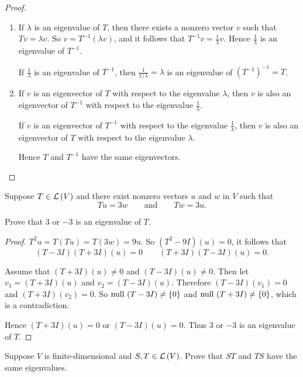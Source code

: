 \begin{proof}
    \begin{enumerate}[label={(\alph*)}]
        \item If $\lambda$ is an eigenvalue of $T$, then there exists a nonzero vector $v$ such that $Tv = \lambda v$. So $v = T^{-1}(\lambda v)$, and it follows that $T^{-1}v = \frac{1}{\lambda}v$. Hence $\frac{1}{\lambda}$ is an eigenvalue of $T^{-1}$.

              If $\frac{1}{\lambda}$ is an eigenvalue of $T^{-1}$, then $\frac{1}{1/\lambda} = \lambda$ is an eigenvalue of ${(T^{-1})}^{-1} = T$.
        \item If $v$ is an eigenvector of $T$ with respect to the eigenvalue $\lambda$, then $v$ is also an eigenvector of $T^{-1}$ with respect to the eigenvalue $\frac{1}{\lambda}$.

              If $v$ is an eigenvector of $T^{-1}$ with respect to the eigenvalue $\frac{1}{\lambda}$, then $v$ is also an eigenvector of $T$ with respect to the eigenvalue $\lambda$.

              Hence $T$ and $T^{-1}$ have the same eigenvectors.\qedhere
    \end{enumerate}
\end{proof}
\newpage

\begin{exercise}
    Suppose $T \in \mathcal{L}\left({V}\right)$ and there exist nonzero vectors $u$ and $w$ in $V$ such that
    \[
        Tu = 3w \qquad\text{and}\qquad Tw = 3u.
    \]

    Prove that $3$ or $-3$ is an eigenvalue of $T$.
\end{exercise}

\begin{proof}
    $T^{2}u = T(Tu) = T(3w) = 9u$. So $(T^{2} - 9I)(u) = 0$, it follows that
    \[
        (T - 3I)(T + 3I)(u) = 0\qquad (T + 3I)(T - 3I)(u) = 0.
    \]

    Assume that $(T + 3I)(u)\ne 0$ and $(T - 3I)(u)\ne 0$. Then let $v_{1} = (T + 3I)(u)$ and $v_{2} = (T - 3I)(u)$. Therefore $(T - 3I)(v_{1}) = 0$ and $(T + 3I)(v_{2}) = 0$. So $\operatorname{null}\,{(T - 3I)}\ne \{0\}$ and $\operatorname{null}\,{(T + 3I)}\ne \{0\}$, which is a contradiction.

    Hence  $(T + 3I)(u) = 0$ or $(T - 3I)(u) = 0$. Thus $3$ or $-3$ is an eigenvalue of $T$.
\end{proof}
\newpage

\begin{exercise}
    Suppose $V$ is finite-dimensional and $S, T \in \mathcal{L}\left({V}\right)$. Prove that $ST$ and $TS$ have the same eigenvalues.
\end{exercise}

